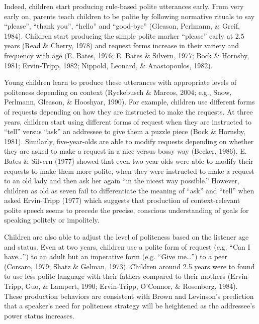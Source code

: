 \documentclass[oneside]{report}
\begin{document}
Indeed, children start producing rule-based polite utterances early.
From very early on, parents teach children to be polite by following
normative rituals to say ``please'', ``thank you'', ``hello'' and
``good-bye'' (Gleason, Perlmann, \& Greif, 1984). Children start
producing the simple polite marker ``please'' early at 2.5 years (Read
\& Cherry, 1978) and request forms increase in their variety and
frequency with age (E. Bates, 1976; E. Bates \& Silvern, 1977; Bock \&
Hornsby, 1981; Ervin-Tripp, 1982; Nippold, Leonard, \& Anastopoulos,
1982).

Young children learn to produce these utterances with appropriate levels
of politeness depending on context (Ryckebusch \& Marcos, 2004; e.g.,
Snow, Perlmann, Gleason, \& Hooshyar, 1990). For example, children use
different forms of requests depending on how they are instructed to make
the requests. At three years, children start using different forms of
request when they are instructed to ``tell'' versus ``ask'' an addressee
to give them a puzzle piece (Bock \& Hornsby, 1981). Similarly,
five-year-olds are able to modify requests depending on whether they are
asked to make a request in a nice versus bossy way (Becker, 1986). E.
Bates \& Silvern (1977) showed that even two-year-olds were able to
modify their requests to make them more polite, when they were
instructed to make a request to an old lady and then ask her again ``in
the nicest way possible.'' However, children as old as seven fail to
differentiate the meaning of ``ask'' and ``tell'' when asked Ervin-Tripp
(1977) which suggests that production of context-relevant polite speech
seems to precede the precise, conscious understanding of goals for
speaking politely or impolitely.

Children are also able to adjust the level of politeness based on the
listener age and status. Even at two years, children use a polite form
of request (e.g. ``Can I have\ldots{}'') to an adult but an imperative
form (e.g. ``Give me\ldots{}'') to a peer (Corsaro, 1979; Shatz \&
Gelman, 1973). Children around 2.5 years were to found to use less
polite language with their fathers compared to their mothers
(Ervin-Tripp, Guo, \& Lampert, 1990; Ervin-Tripp, O'Connor, \&
Rosenberg, 1984). These production behaviors are consistent with Brown
and Levinson's prediction that a speaker's need for politeness strategy
will be heightened as the addressee's power status increases.
\end{document}
